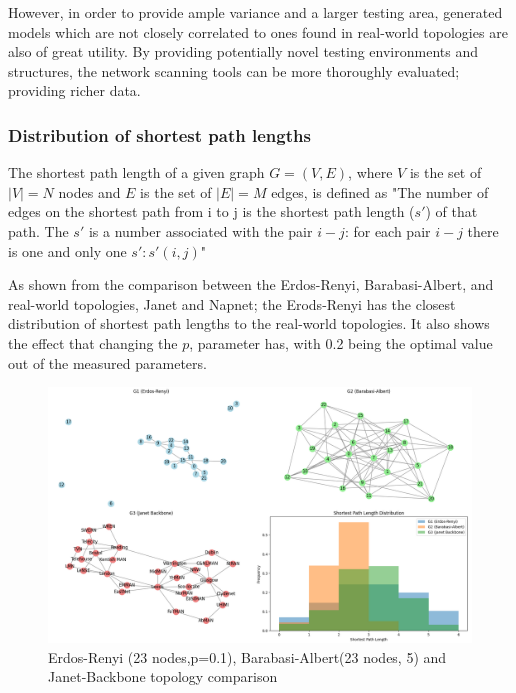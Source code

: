 However, in order to provide ample variance and a larger testing area, generated models which are not closely correlated to ones found in real-world topologies are also of great utility. By providing potentially novel testing environments and structures, the network scanning tools can be more thoroughly evaluated; providing richer data.


\subsubsection{Distribution of shortest path lengths}
The shortest path length of a given graph $G = (V,E)$, where $V$ is the set of $|V|=N$ nodes and $E$ is the set of $|E|=M$ edges, is defined as "The number of edges on the shortest path from i to j is the shortest path length ($s'$) of that path. The $s'$ is a number associated with the pair $i-j$: for each pair $i-j$ there is one and only one $s':s'(i,j)$"\cite{santos2022shortestpathpathlength} 

As shown from the comparison between the Erdos-Renyi, Barabasi-Albert, and real-world topologies, Janet and Napnet; the Erods-Renyi has the closest distribution of shortest path lengths to the real-world topologies. It also shows the effect that changing the $p$, parameter has, with 0.2 being the optimal value out of the measured parameters. 

\begin{figure}
    \centering
    \includegraphics[width=0.7\linewidth]{images/final-topo-comparison/1_1.png}
    \caption{Erdos-Renyi (23 nodes,p=0.1), Barabasi-Albert(23 nodes, 5) and Janet-Backbone topology comparison}
    \label{fig:1_1_comparison}
\end{figure}

